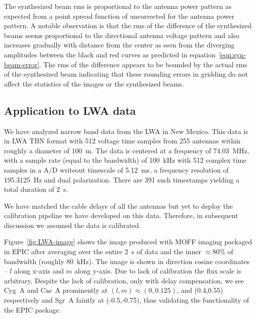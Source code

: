 \documentclass[a4paper,fleqn,usenatbib]{../mnras}
\begin{document}
The synthesized beam rms is proportional to the antenna power pattern as 
expected from a point spread function of uncorrected for the antenna power 
pattern. A notable observation is that the rms of the difference of
the synthesized beams seems proportional to the directional antenna voltage
pattern and also increases gradually with distance from the center as seen 
from the diverging amplitudes between the black and red curves as predicted
in equation~\ref{eqn:syn-beam-error}. The rms of the difference appears to 
be bounded by the actual rms of the synthesized beam indicating that these
rounding errors in gridding do not affect the statistics of the images or
the synthesized beams.

\subsection{Application to LWA data}\label{sec:LWA-data}

We have analyzed narrow band data from the LWA in New Mexico. This data is  
in LWA TBN format with 512 voltage time samples from 255 antennas within 
roughly a diameter of 100~m. The data is centered at a frequency of 74.03~MHz,
with a sample rate (equal to the bandwidth) of 100~kHz with 512 complex time 
samples in a A/D writeout timescale of 5.12~ms, a frequency resolution of 
195.3125~Hz and dual polarization. There are 391 such timestamps yielding a
total duration of 2~s. 

We have matched the cable delays of all the antennas but yet to deploy the 
calibration pipeline we have developed on this data. Therefore, in 
subsequent discussion we assumed the data is calibrated. 

Figure~\ref{fig:LWA-image} shows the image produced with MOFF imaging 
packaged in EPIC after averaging over the entire 2~s of data and the inner
$\approx 80$\% of bandwidth (roughly 80~kHz). The image is shown in direction 
cosine coordinates -- $l$ along x-axis and $m$ along y-axis. Due to lack of
calibration the flux scale is arbitrary. Despite the lack of calibration,
only with delay compensation, we see Cyg~A and Cas~A prominently at
$(l,m)\approx (0, 0.125)$, and (0.4,0.55) respectively and Sgr~A faintly at
(-0.5,-0.75), thus validating the functionality of the EPIC package.
\end{document}
